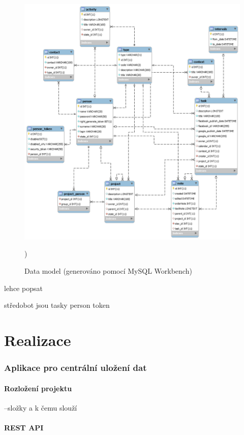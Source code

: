 \documentclass[thesis=B,czech]{FITthesis}[2012/06/26]
\begin{document}
\begin{figure}[h!]\centering
	\includegraphics[width=1\textwidth]{pictures/gtd_data_model}
	\caption{Data model (generováno pomocí MySQL Workbench)})\label{fig:gtd_data_model}
\end{figure}

lehce popsat

středobot jsou tasky
person token


\chapter{Realizace}

\subsection{Aplikace pro centrální uložení dat}

\subsubsection{Rozložení projektu}

--složky a k čemu slouží

\subsubsection{REST API}
\end{document}

